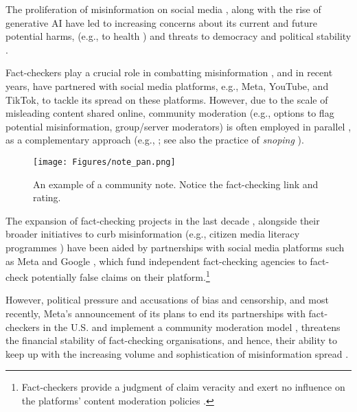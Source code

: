 

The proliferation of misinformation on social media \citep{arnold2020onlineFC,diakopoulos2020computational}, along with the rise of generative AI \citep{augenstein2024factualityLLMs} have led to increasing concerns about its current and future potential harms, (e.g., to health \citep{ijerph19095321}) and threats to democracy and political stability 
\citep{reglitz2022fake}. 

Fact-checkers play a crucial role in combatting misinformation \citep{graves2017anatomy}, and in recent years, have partnered with social media platforms, e.g., Meta, YouTube, and TikTok, to tackle its spread on these platforms. However, due to the scale of misleading content shared online, community moderation (e.g., options to flag potential misinformation, group/server moderators) is often employed in parallel \citep{morrow2022emerging}, as a complementary approach (e.g., \citep{YouTubeMisinfo}; see also the practice of \textit{snoping} \citep{pilarski_community_2024}). 

\begin{figure}[t]
    \centering
    \texttt{[image: Figures/note\_pan.png]}
    \caption{An example of a community note. Notice the fact-checking link and rating.}
    \label{fig:notes_sample}
\end{figure}


The expansion of fact-checking projects in the last decade \citep{lauer2024growfactcheck}, alongside their broader initiatives to curb misinformation (e.g., citizen media literacy programmes \citep{juneja2022human}) have been aided by partnerships with social media platforms such as Meta and Google \citep{graves2020infrastructure}, which fund independent fact-checking agencies to fact-check potentially false claims on their platform.\footnote{Fact-checkers provide a judgment of claim veracity and exert no influence on the platforms' content moderation policies \citep{PoynterMeta2025}.} 

However, political pressure and accusations of bias and censorship, %
and most recently, Meta's announcement of its plans to end its partnerships with fact-checkers in the U.S. and implement a community moderation model \citep{MetaFactChecking2025}, threatens the financial stability of fact-checking organisations, and hence, their ability to keep up with the increasing volume and sophistication of misinformation spread \citep{Duke2024FactCheckingSputters,IFCN2024report}.


